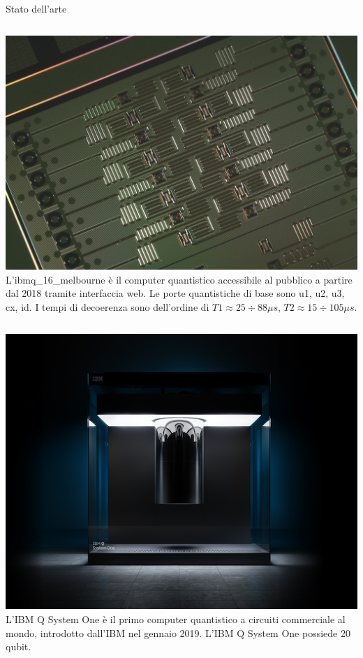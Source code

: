 \documentclass{beamer}
\begin{document}
    \begin{frame}{Stato dell'arte}
        \begin{columns}
            \includegraphics[width=\textwidth]{gfx/ibm_16}
            L'ibmq\_16\_melbourne è il computer quantistico accessibile al pubblico 
            a partire dal 2018 tramite interfaccia web. Le porte quantistiche di base 
            sono u1, u2, u3, cx, id. I tempi di decoerenza sono dell'ordine di 
            $T1 \approx 25 \div 88 \mu s$, $T2 \approx 15 \div 105 \mu s$. 
        \end{columns}

        \begin{columns}
            \includegraphics[width=\textwidth]{gfx/ibm_q_system_one.png}
            L'IBM Q System One è il primo computer quantistico a circuiti commerciale al mondo, 
            introdotto dall'IBM nel gennaio 2019. L'IBM Q System One possiede 20 qubit. 
        \end{columns}
    \end{frame}
\end{document}
